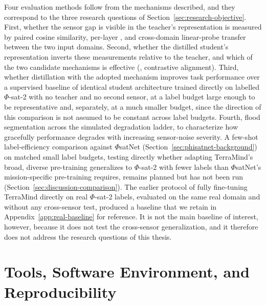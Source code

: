 Four evaluation methods follow from the mechanisms described, and they correspond to the three research questions of Section~\ref{sec:research-objective}.
First, whether the sensor gap is visible in the teacher's representation is measured by paired cosine similarity, per-layer , and cross-domain linear-probe transfer between the two input domains.
Second, whether the distilled student's representation inverts these measurements relative to the teacher, and which of the two candidate mechanisms is effective (, contrastive alignment).
Third, whether distillation with the adopted mechanism improves  task performance over a supervised baseline of identical student architecture trained directly on labelled $\Phi$-sat-2 with no teacher and no second sensor, at a label budget large enough to be representative and, separately, at a much smaller budget, since the direction of this comparison is not assumed to be constant across label budgets.
Fourth, flood segmentation across the simulated degradation ladder, to characterize how gracefully performance degrades with increasing sensor-noise severity.
A few-shot label-efficiency comparison against $\Phi$satNet (Section~\ref{sec:phisatnet-background}) on matched small label budgets, testing directly whether adapting TerraMind's broad, diverse pre-training generalizes to $\Phi$-sat-2 with fewer labels than $\Phi$satNet's mission-specific pre-training requires, remains planned but has not been run (Section~\ref{sec:discussion-comparison}).
The earlier protocol of fully fine-tuning TerraMind directly on real $\Phi$-sat-2  labels, evaluated on the same real domain and without any cross-sensor test, produced a baseline  that we retain in Appendix~\ref{app:real-baseline} for reference.
It is not the main baseline of interest, however, because it does not test the cross-sensor generalization, and it therefore does not address the research questions of this thesis.

\section{Tools, Software Environment, and Reproducibility}
\label{sec:reproducibility}

